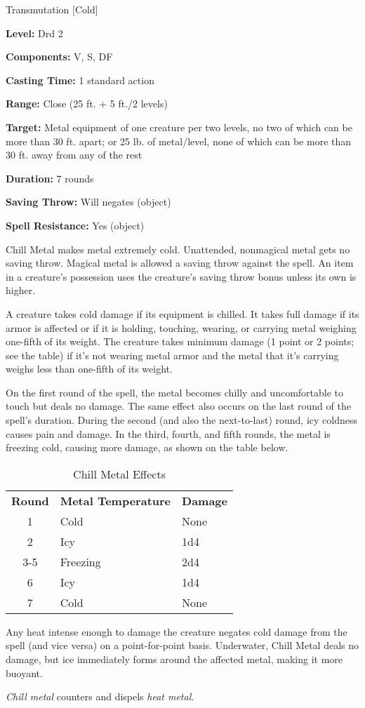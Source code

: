 
Transmutation [Cold]

\textbf{Level:} Drd 2

\textbf{Components:} V, S, DF

\textbf{Casting Time:} 1 standard action

\textbf{Range:} Close (25 ft. + 5 ft./2 levels)

\textbf{Target:} Metal equipment of one creature per two levels, no two of which 
can be more than 30 ft. apart; or 25 lb. of metal/level, none of which can be more 
than 30 ft. away from any of the rest

\textbf{Duration:} 7 rounds

\textbf{Saving Throw:} Will negates (object)

\textbf{Spell Resistance:} Yes (object)

Chill Metal makes metal extremely cold. Unattended, nonmagical metal gets 
no saving throw. Magical metal is allowed a saving throw against the spell. An 
item in a creature's possession uses the creature's saving throw bonus unless its 
own is higher.

A creature takes cold damage if its equipment is chilled. It takes full damage 
if its armor is affected or if it is holding, touching, wearing, or carrying metal 
weighing one-fifth of its weight. The creature takes minimum damage (1 point or 
2 points; see the table) if it's not wearing metal armor and the metal that it's 
carrying weighs less than one-fifth of its weight.

On the first round of the spell, the metal becomes chilly and uncomfortable to 
touch but deals no damage. The same effect also occurs on the last round of the 
spell's duration. During the second (and also the next-to-last) round, icy coldness 
causes pain and damage. In the third, fourth, and fifth rounds, the metal is freezing 
cold, causing more damage, as shown on the table below.

\begin{table}[htb]
\caption{Chill Metal Effects}
\centering
\begin{tabular}{c l l}
\textbf{Round} & \textbf{Metal Temperature} & \textbf{Damage}\\
1 & Cold & None\\
2 & Icy & 1d4\\
3-5 & Freezing & 2d4\\
6 & Icy & 1d4\\
7 & Cold & None\\
\end{tabular}
\end{table}

Any heat intense enough to damage the creature negates cold damage from the spell 
(and vice versa) on a point-for-point basis. Underwater, Chill Metal deals 
no damage, but ice immediately forms around the affected metal, making it more 
buoyant.

\textit{Chill metal} counters and dispels \textit{heat metal}.

